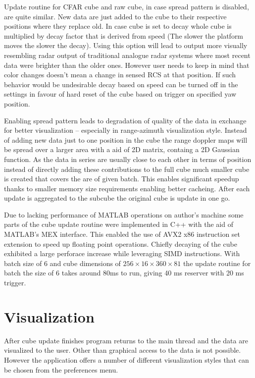Update routine for CFAR cube and raw cube, in case spread pattern is disabled, are quite similar.
New data are just added to the cube to their respective positions where they replace old.
In case cube is set to decay whole cube is multiplied by decay factor that is derived from speed (The slower the platform moves the slower the decay).
Using this option will lead to output more visually resembling radar output of traditional analogue radar systems where most recent data were brighter than the older ones.
However user needs to keep in mind that color changes doesn't mean a change in sensed RCS at that position.
If such behavior would be undesirable decay based on speed can be turned off in the settings in favour of hard reset of the cube based on trigger on specified yaw position.


Enabling spread pattern leads to degradation of quality of the data in exchange for better visualization -- especially in range-azimuth visualization style.
Instead of adding new data just to one position in the cube the range doppler maps will be spread over a larger area with a aid of 2D matrix, containg a 2D Gaussian function.
As the data in series are usually close to each other in terms of position instead of directly adding these contributions to the full cube much smaller cube is created that covers the are of given batch.
This enables significant speedup thanks to smaller memory size requirements enabling better cacheing.
After each update is aggregated to the subcube the original cube is update in one go.

Due to lacking performance of MATLAB operations on author's machine some parts of the cube update routine were implemented in C++ with the aid of MATLAB's MEX interface.
This enabled the use of AVX2 x86 instruction set extension to speed up floating point operations.
Chiefly decaying of the cube exhibited a large perforace increase while leveraging SIMD instructions.
With batch size of 6 and cube dimensions of $256 \times 16 \times 360 \times 81$ the update routine for batch the size of 6 takes around 80ms to run, giving 40 ms reserver with 20 ms trigger.


\section{Visualization}

After cube update finishes program returns to the main thread and the data are visualized to the user.
Other than graphical access to the data is not possible.
However the application offers a number of different visualization styles that can be chosen from the preferences menu.

